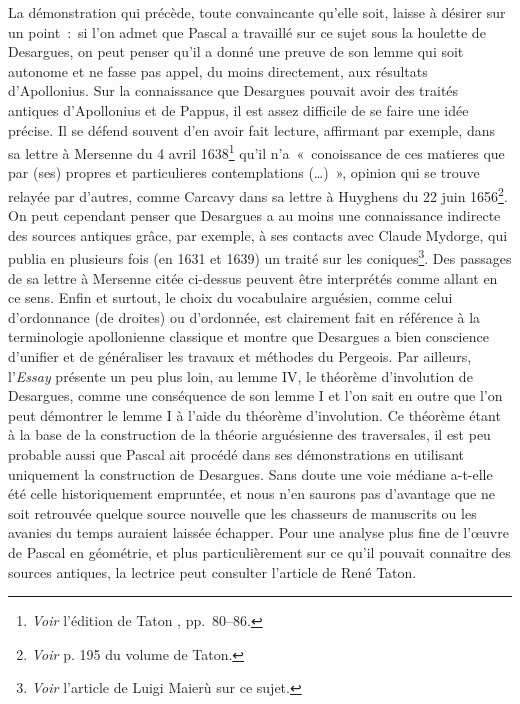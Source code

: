 \documentclass[12pt, a4paper]{article}
\begin{document}
La démonstration qui précède, toute convaincante qu'elle soit, laisse à désirer sur un point~:~si l'on admet que Pascal a travaillé sur ce sujet sous la houlette de Desargues, on peut penser qu'il a donné une preuve de son lemme qui soit autonome et ne fasse pas appel, du moins directement, aux résultats d'Apollonius. Sur la connaissance que Desargues pouvait avoir des traités antiques d'Apollonius et de Pappus, il est assez difficile de se faire une idée précise. Il se défend souvent d'en avoir fait lecture, affirmant par exemple, dans sa lettre à Mersenne du 4 avril 1638\footnote{\textit{Voir} l'édition de Taton \cite{taton}, pp.~80--86.} qu'il n'a~«~conoissance de ces matieres que par (ses) propres et particulieres contemplations (\ldots)~», opinion qui se trouve relayée par d'autres, comme Carcavy dans sa lettre à Huyghens du 22 juin 1656\footnote{\textit{Voir} p. 195 du volume \cite{taton} de Taton.}. On peut cependant penser que Desargues a au moins une connaissance indirecte des sources antiques grâce, par exemple, à ses contacts avec Claude Mydorge, qui publia en plusieurs fois (en 1631 et 1639) un traité sur les coniques\footnote{\textit{Voir} l'article \cite{maieru-mydorge} de Luigi Maier\`u sur ce sujet.}. Des passages de sa lettre à Mersenne citée ci-dessus peuvent être interprétés comme allant en ce sens. Enfin et surtout, le choix du vocabulaire arguésien, comme celui d'ordonnance (de droites) ou d'ordonnée, est clairement fait en référence à la terminologie apollonienne classique et montre que Desargues a bien conscience d'unifier et de généraliser les travaux et méthodes du Pergeois. Par ailleurs, l'\textit{Essay} présente un peu plus loin, au lemme IV, le théorème d'involution de Desargues, comme une conséquence de son lemme I et l'on sait en outre que l'on peut démontrer le lemme I à l'aide du théorème d'involution. Ce théorème étant à la base de la construction de la théorie arguésienne des traversales, il est peu probable aussi que Pascal ait procédé dans ses démonstrations en utilisant uniquement la construction de Desargues. Sans doute une voie médiane a-t-elle été celle historiquement empruntée, et nous n'en saurons pas d'avantage que ne soit retrouvée quelque source nouvelle que les chasseurs de manuscrits ou les avanies du temps auraient laissée échapper. Pour une analyse plus fine de l'{\oe}uvre de Pascal en géométrie, et plus particulièrement sur ce qu'il pouvait connaitre des sources antiques, la lectrice peut consulter l'article \cite{taton-pascal} de René Taton.
\end{document}
